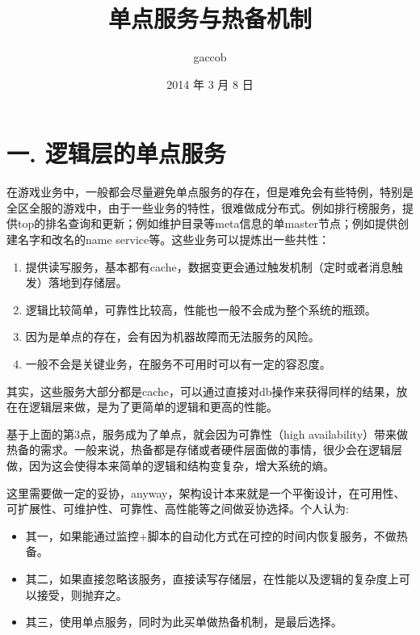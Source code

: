 

\title{\ZHH \Huge 单点服务与热备机制}
\author{\small gaccob}
\date{\small 2014 年 3 月 8 日}
\maketitle

\section* {\Large \ZHH 一. 逻辑层的单点服务} {
    {在游戏业务中，一般都会尽量避免单点服务的存在，但是难免会有些特例，特别是全区全服的游戏中，由于一些业务的特性，很难做成分布式。例如排行榜服务，提供top的排名查询和更新；例如维护目录等meta信息的单master节点；例如提供创建名字和改名的name service等。这些业务可以提炼出一些共性：}
    \begin{enumerate}
    \item{提供读写服务，基本都有cache，数据变更会通过触发机制（定时或者消息触发）落地到存储层。}
    \item{逻辑比较简单，可靠性比较高，性能也一般不会成为整个系统的瓶颈。}
    \item{因为是单点的存在，会有因为机器故障而无法服务的风险。}
    \item{一般不会是关键业务，在服务不可用时可以有一定的容忍度。}
    \end{enumerate}\par

    {其实，这些服务大部分都是cache，可以通过直接对db操作来获得同样的结果，放在在逻辑层来做，是为了更简单的逻辑和更高的性能。}\par
    {基于上面的第3点，服务成为了单点，就会因为可靠性（high availability）带来做热备的需求。一般来说，热备都是存储或者硬件层面做的事情，很少会在逻辑层做，因为这会使得本来简单的逻辑和结构变复杂，增大系统的熵。}\par
    {这里需要做一定的妥协，anyway，架构设计本来就是一个平衡设计，在可用性、可扩展性、可维护性、可靠性、高性能等之间做妥协选择。个人认为:}\par
    \begin{itemize}
    \item{其一，如果能通过监控+脚本的自动化方式在可控的时间内恢复服务，不做热备。}
    \item{其二，如果直接忽略该服务，直接读写存储层，在性能以及逻辑的复杂度上可以接受，则抛弃之。}
    \item{其三，使用单点服务，同时为此买单做热备机制，是最后选择。}
    \end{itemize}
}


